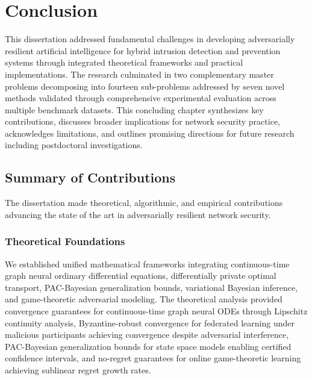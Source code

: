 \chapter*{Conclusion}

This dissertation addressed fundamental challenges in developing adversarially resilient artificial intelligence for hybrid intrusion detection and prevention systems through integrated theoretical frameworks and practical implementations. The research culminated in two complementary master problems decomposing into fourteen sub-problems addressed by seven novel methods validated through comprehensive experimental evaluation across multiple benchmark datasets. This concluding chapter synthesizes key contributions, discusses broader implications for network security practice, acknowledges limitations, and outlines promising directions for future research including postdoctoral investigations.

\section*{Summary of Contributions}

The dissertation made theoretical, algorithmic, and empirical contributions advancing the state of the art in adversarially resilient network security.

\subsection*{Theoretical Foundations}

We established unified mathematical frameworks integrating continuous-time graph neural ordinary differential equations, differentially private optimal transport, PAC-Bayesian generalization bounds, variational Bayesian inference, and game-theoretic adversarial modeling. The theoretical analysis provided convergence guarantees for continuous-time graph neural ODEs through Lipschitz continuity analysis, Byzantine-robust convergence for federated learning under malicious participants achieving convergence despite adversarial interference, PAC-Bayesian generalization bounds for state space models enabling certified confidence intervals, and no-regret guarantees for online game-theoretic learning achieving sublinear regret growth rates.

